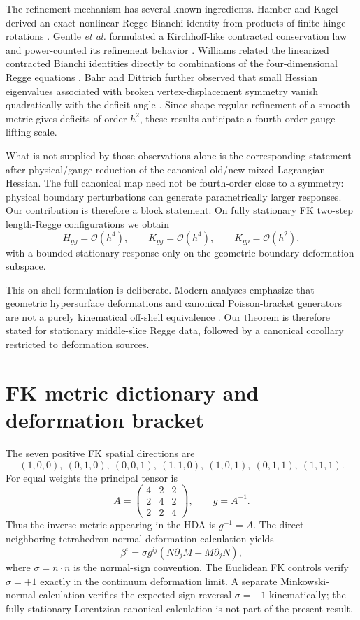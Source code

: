 \documentclass[11pt]{article}
\newcommand{\Oh}{\mathcal{O}}
\newcommand{\Kgg}{K_{gg}}
\newcommand{\Kgp}{K_{gp}}
\begin{document}
The refinement mechanism has several known ingredients. Hamber and Kagel derived an exact nonlinear Regge Bianchi identity from products of finite hinge rotations \cite{HamberKagel2004}. Gentle \emph{et al.} formulated a Kirchhoff-like contracted conservation law and power-counted its refinement behavior \cite{GentleEtAl2009}. Williams related the linearized contracted Bianchi identities directly to combinations of the four-dimensional Regge equations \cite{Williams2012}. Bahr and Dittrich further observed that small Hessian eigenvalues associated with broken vertex-displacement symmetry vanish quadratically with the deficit angle \cite{BahrDittrich2009}. Since shape-regular refinement of a smooth metric gives deficits of order $h^2$, these results anticipate a fourth-order gauge-lifting scale.

What is not supplied by those observations alone is the corresponding statement after physical/gauge reduction of the canonical old/new mixed Lagrangian Hessian. The full canonical map need not be fourth-order close to a symmetry: physical boundary perturbations can generate parametrically larger responses. Our contribution is therefore a block statement. On fully stationary FK two-step length-Regge configurations we obtain
\[
H_{gg}=\Oh(h^4),\qquad \Kgg=\Oh(h^4),\qquad \Kgp=\Oh(h^2),
\]
with a bounded stationary response only on the geometric boundary-deformation subspace.

This on-shell formulation is deliberate. Modern analyses emphasize that geometric hypersurface deformations and canonical Poisson-bracket generators are not a purely kinematical off-shell equivalence \cite{BojowaldDuqueShah2025}. Our theorem is therefore stated for stationary middle-slice Regge data, followed by a canonical corollary restricted to deformation sources.

\section{FK metric dictionary and deformation bracket}
The seven positive FK spatial directions are
\[
(1,0,0),\ (0,1,0),\ (0,0,1),\ (1,1,0),\ (1,0,1),\ (0,1,1),\ (1,1,1).
\]
For equal weights the principal tensor is
\[
A=\begin{pmatrix}4&2&2\\2&4&2\\2&2&4\end{pmatrix},
\qquad g=A^{-1}.
\]
Thus the inverse metric appearing in the HDA is $g^{-1}=A$. The direct neighboring-tetrahedron normal-deformation calculation yields
\[
\beta^i=\sigma g^{ij}(N\partial_jM-M\partial_jN),
\]
where $\sigma=n\cdot n$ is the normal-sign convention. The Euclidean FK controls verify $\sigma=+1$ exactly in the continuum deformation limit. A separate Minkowski-normal calculation verifies the expected sign reversal $\sigma=-1$ kinematically; the fully stationary Lorentzian canonical calculation is not part of the present result.
\end{document}
